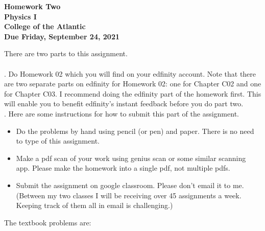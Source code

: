 \documentclass[12pt]{article}
\begin{document}
\pagestyle{empty}
 
\begin{center}
{\LARGE {\bf Homework Two}}\\
\bigskip
{\Large {\bf Physics I}}\\
\bigskip
{\Large {\bf College of the Atlantic}}\\
\bigskip
{ {\bf Due Friday, September 24, 2021}}\\ 
\end{center}
\medskip

\noindent There are two parts to this assignment.\\

\hspace{2mm}\\

.  Do Homework 02 which you will find
on your edfinity account.  Note that there are two separate parts on
edfinity for Homework 02: one for Chapter C02 and one for Chapter
C03.  I recommend doing the edfinity part of the homework first.  This
will enable you to benefit edfinity's instant feedback before you do
part two.\\ 


.  Here are some
instructions for how to submit this part of the assignment.
\begin{itemize}
\item Do the problems by hand using pencil (or pen) and paper.
  There is no need to type of this assignment.
\item Make a pdf scan of your work using genius scan or some
  similar scanning app.  Please make the homework into a single
  pdf, not multiple pdfs.
\item Submit the assignment on google classroom.  Please don't
  email it to me.  (Between my two classes I will be receiving
  over 45 assignments a week.  Keeping track of them all in email
  is challenging.)\\
\end{itemize}

\noindent The textbook problems are:   
\end{document}
